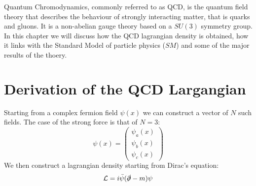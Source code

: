 Quantum Chromodynamics, commonly referred to as QCD, is the quantum field theory that describes the behaviour of strongly interacting matter, that is quarks and gluons. It is a non-abelian gauge theory based on a $SU(3)$ symmetry group. In this chapter we will discuss how the QCD lagrangian density is obtained, how it links with the Standard Model of particle physics ($SM$) and some of the major results of the thoery. \cite{peskin}

\section{Derivation of the QCD Largangian}
Starting from a complex fermion field $\psi(x)$ we can construct a vector of $N$ such fields. The case of the strong force is that of $N=3$:
\begin{equation}
  \psi(x) = \begin{pmatrix}
      \psi_a(x)\\
      \psi_b(x)\\
      \psi_c(x)
  \end{pmatrix}
\end{equation}
We then construct a lagrangian density starting from Dirac's equation:
\begin{equation}
  \mathcal{L} = i\bar{\psi}(\slashed{\partial} - m )\psi
\end{equation}
